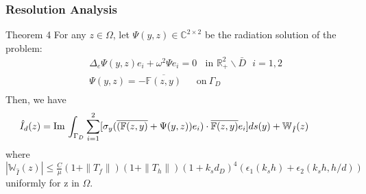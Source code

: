 \documentclass[utf-8,8pt]{beamer}
\newcommand{\R}{\mathbb{R}}
\renewcommand{\Im}{\mathrm{Im}\,}
\newcommand{\Ga}{\Gamma}
\newcommand{\Om}{\Omega}
\newcommand{\bks}{\backslash}
\renewcommand{\C}{{\mathbb{C}}}
\renewcommand{\Im}{\mathrm{Im}\,}
\newcommand{\F}{\mathbb{F}}
\newcommand{\W}{\mathbb{W}}
\newcommand{\be}{\begin{eqnarray}}
\newcommand{\ee}{\end{eqnarray}}
\newcommand{\ben}{\begin{eqnarray*}}
\newcommand{\een}{\end{eqnarray*}}
\begin{document}
\begin{frame}
\frametitle{Resolution Analysis}
\begin{block}{Theorem 4}
	For any $z\in\Omega$, let $\Psi(y,z)\in\C^{2\times2}$ be the radiation solution of the problem:
	\ben
	& & \Delta_e \Psi(y,z)e_i + \omega^2\Psi e_i= 0 \ \ \ \ \mbox{in }\R_+^2\bks \bar{D} \ \ \ i=1,2 \\
	& &\Psi(y,z)= -\overline{\F(z,y)} \ \ \ \ \ \ \ \mbox{on} \ \Ga_D  \\
	\een
	Then, we have
	\be\hspace{-1cm}
	\hat{I}_d(z)=\Im\int_{\Gamma_D}\sum_{i=1}^2[\sigma_y (\overline{(\F(z,y)}+\Psi(y,z))e_i)\cdot \overline{\F(z,y)}e_i]ds(y)+\W_{\hat{I}}(z)
	\ee
	where $|\W_{\hat{I}}(z)|\leq \frac{C}{\mu}(1+\|T_f\|)(1+\|T_h\|)(1+k_s d_D)^4(\epsilon_1(k_s h)+\epsilon_2(k_s h,h/d))$ uniformly for z in $\Om$.
\end{block}
\end{frame}
\end{document}
